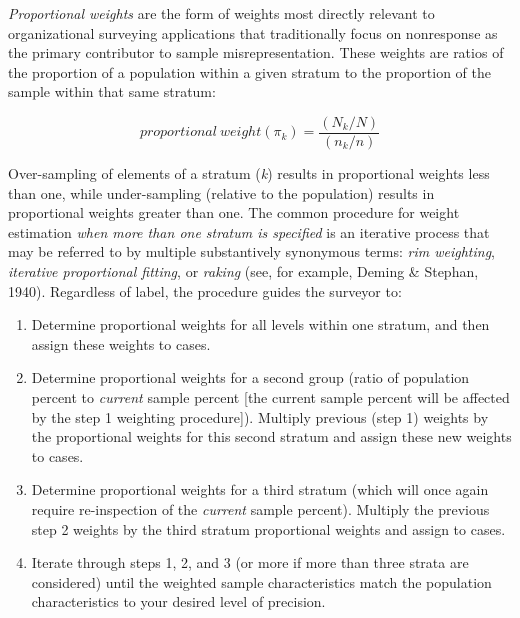 \documentclass[
  man,mask]{apa7}
\begin{document}
\emph{Proportional weights} are the form of weights most directly relevant to organizational surveying applications that traditionally focus on nonresponse as the primary contributor to sample misrepresentation. These weights are ratios of the proportion of a population within a given stratum to the proportion of the sample within that same stratum:

\begin{equation}
proportional \: weight(\pi_k) = \frac{(N_k/N)}{(n_k/n)}
\end{equation}

Over-sampling of elements of a stratum (\emph{k}) results in proportional weights less than one, while under-sampling (relative to the population) results in proportional weights greater than one.
The common procedure for weight estimation \emph{when more than one stratum is specified} is an iterative process that may be referred to by multiple substantively synonymous terms: \emph{rim weighting}, \emph{iterative proportional fitting}, or \emph{raking} (see, for example, Deming \& Stephan, 1940). Regardless of label, the procedure guides the surveyor to:

\begin{enumerate}
\def\labelenumi{\arabic{enumi})}
\item
  Determine proportional weights for all levels within one stratum, and then assign these weights to cases.
\item
  Determine proportional weights for a second group (ratio of population percent to \emph{current} sample percent {[}the current sample percent will be affected by the step 1 weighting procedure{]}). Multiply previous (step 1) weights by the proportional weights for this second stratum and assign these new weights to cases.
\item
  Determine proportional weights for a third stratum (which will once again require re-inspection of the \emph{current} sample percent). Multiply the previous step 2 weights by the third stratum proportional weights and assign to cases.
\item
  Iterate through steps 1, 2, and 3 (or more if more than three strata are considered) until the weighted sample characteristics match the population characteristics to your desired level of precision.
\end{enumerate}
\end{document}
